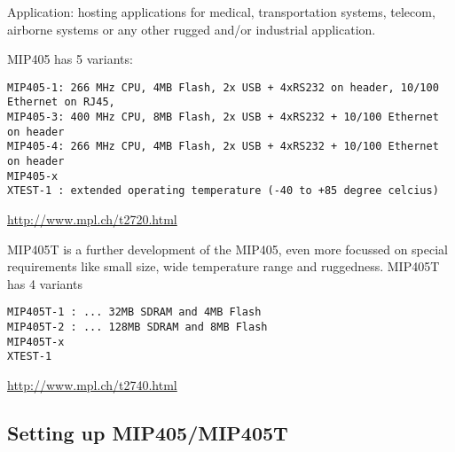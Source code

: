Application: hosting applications for medical, transportation systems, telecom,
airborne systems or any other rugged and/or industrial application.


MIP405 has 5 variants:
\begin{verbatim}
MIP405-1: 266 MHz CPU, 4MB Flash, 2x USB + 4xRS232 on header, 10/100 Ethernet on RJ45,
MIP405-3: 400 MHz CPU, 8MB Flash, 2x USB + 4xRS232 + 10/100 Ethernet on header
MIP405-4: 266 MHz CPU, 4MB Flash, 2x USB + 4xRS232 + 10/100 Ethernet on header
MIP405-x
XTEST-1 : extended operating temperature (-40 to +85 degree celcius)
\end{verbatim}
\url{http://www.mpl.ch/t2720.html}

MIP405T is a further development of the MIP405, even more focussed on special
requirements like small size, wide temperature range and ruggedness. MIP405T has
4 variants
\begin{verbatim}
MIP405T-1 : ... 32MB SDRAM and 4MB Flash
MIP405T-2 : ... 128MB SDRAM and 8MB Flash
MIP405T-x
XTEST-1
\end{verbatim}
\url{http://www.mpl.ch/t2740.html}


\subsection{Setting up MIP405/MIP405T}


